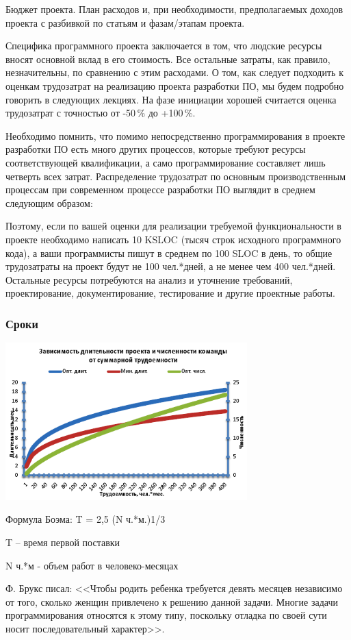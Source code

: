 \documentclass{../industrial-development}
\begin{document}
Бюджет проекта. План расходов и, при необходимости, предполагаемых доходов проекта с разбивкой по статьям и фазам/этапам проекта.

Специфика программного проекта заключается в том, что людские ресурсы вносят основной вклад в его стоимость. Все остальные затраты, как правило, незначительны, по сравнению с этим расходами. О том, как следует подходить к оценкам трудозатрат на реализацию проекта разработки ПО, мы будем подробно говорить в следующих лекциях. На фазе инициации хорошей считается оценка трудозатрат с точностью от -50\,\% до +100\,\%.

Необходимо помнить, что помимо непосредственно программирования в проекте разработки ПО есть много других процессов, которые требуют ресурсы соответствующей квалификации, а само программирование составляет лишь четверть всех затрат. Распределение трудозатрат по основным производственным процессам при современном процессе разработки ПО выглядит в среднем следующим образом:
 
Поэтому, если по вашей оценки для реализации требуемой функциональности в проекте необходимо написать 10 KSLOC (тысяч строк исходного программного кода), а ваши программисты пишут в среднем по 100 SLOC в день, то общие трудозатраты на проект будут не 100 чел.*дней, а не менее чем 400 чел.*дней. Остальные ресурсы потребуются на анализ и уточнение требований, проектирование, документирование, тестирование и другие проектные работы.

    \begin{frame} \frametitle{Сроки}
         \centerline{\includegraphics[width=0.7\textwidth]{times.png}}
	Формула Боэма: T = 2,5 (N ч.*м.)1/3

T – время первой поставки

N ч.*м - объем работ в человеко-месяцах
    \end{frame}
    \lecturenotes

Ф. Брукс писал: <<Чтобы родить ребенка требуется девять месяцев независимо от того, сколько женщин привлечено к решению данной задачи. Многие задачи программирования относятся к этому типу, поскольку отладка по своей сути носит последовательный характер>>.
\end{document}

